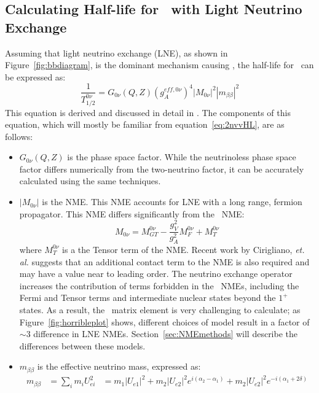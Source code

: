 \documentclass[/main.tex]{subfiles}
\begin{document}
\subsection{Calculating Half-life for \znbb\ with Light Neutrino Exchange}
Assuming that light neutrino exchange (LNE), as shown in Figure~\ref{fig:bbdiagram}, is the dominant mechanism causing \znbb, the half-life for \znbb\ can be expressed as:
\begin{equation}
  \frac{1}{T^{0\nu}_{1/2}}=G_{0\nu}(Q,Z)(g_A^{eff,0\nu})^4|M_{0\nu}|^2|m_{\beta\beta}|^2
\end{equation}
This equation is derived and discussed in detail in \cite{Avignone2008, Engel2017}.
The components of this equation, which will mostly be familiar from equation~\ref{eq:2nvvHL}, are as follows:
\begin{itemize}
\item $G_{0\nu}(Q,Z)$ is the phase space factor.
  While the neutrinoless phase space factor differs numerically from the two-neutrino factor, it can be accurately calculated using the same techniques.
\item $|M_{0\nu}|$ is the NME.
  This NME accounts for LNE with a long range, fermion propagator.
  This NME differs significantly from the \tnbb\ NME:
  \begin{equation}
    M_{0\nu}=M^{0\nu}_{GT} - \frac{g_V^2}{g_A^2}M^{0\nu}_F+M^{0\nu}_T
  \end{equation}
  where $M^{0\nu}_T$ is a the Tensor term of the NME.
  Recent work by Cirigliano, \textit{et. al.} suggests that an additional contact term to the NME is also required and may have a value near to leading order\cite{Cirigliano2018_1}.
  The neutrino exchange operator increases the contribution of terms forbidden in the \tnbb\ NMEs, including the Fermi and Tensor terms and intermediate nuclear states beyond the $1^+$ states.
  As a result, the \znbb\ matrix element is very challenging to calculate; as Figure~\ref{fig:horribleplot} shows, different choices of model result in a factor of ${\sim}3$ difference in LNE NMEs.
  Section~\ref{sec:NMEmethods} will describe the differences between these models.
\item $m_{\beta\beta}$ is the effective neutrino mass, expressed as:
  \begin{equation} \label{eq:mbb}
    \begin{aligned}
      m_{\beta\beta}&=\sum_i m_iU_{ei}^2
      &=m_1|U_{e1}|^2+m_2|U_{e2}|^2e^{i(\alpha_2-\alpha_1)}+m_2|U_{e2}|^2e^{-i(\alpha_1+2\delta)}
    \end{aligned}

\end{equation}
\end{itemize}
\end{document}
